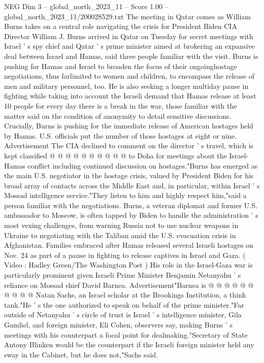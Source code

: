 \begin{textsample}{NEG Dim 3 – global\_north\_2023\_11 – Score 1.00 – global\_north\_2023\_11/200028529.txt}  \label{ex:f3_neg_278}
The meeting in Qatar comes as William Burns takes on a central role navigating the crisis for President Biden CIA Director William J.
Burns arrived in Qatar on Tuesday for secret meetings with Israel ' s spy chief and Qatar ' s prime minister aimed at brokering an expansive deal between Israel and Hamas, said three people familiar with the visit.
Burns is pushing for Hamas and Israel to broaden the focus of their ongoinghostage negotiations, thus farlimited to women and children, to encompass the release of men and military personnel, too.
He is also seeking a longer multiday pause in fighting while taking into account the Israeli demand that Hamas release at least 10 people for every day there is a break in the war, those familiar with the matter said on the condition of anonymity to detail sensitive discussions.
Crucially, Burns is pushing for the immediate release of American hostages held by Hamas.
U.S. officials put the number of those hostages at eight or nine.
Advertisement The CIA declined to comment on the director ' s travel, which is kept classified @ @ @ @ @ @ @ @ @ @ to Doha for meetings about the Israel-Hamas conflict including continued discussion on hostages."Burns has emerged as the main U.S. negotiator in the hostage crisis, valued by President Biden for his broad array of contacts across the Middle East and, in particular, within Israel ' s Mossad intelligence service."They listen to him and highly respect him,"said a person familiar with the negotiations.
Burns, a veteran diplomat and former U.S. ambassador to Moscow, is often tapped by Biden to handle the administration ' s most vexing challenges, from warning Russia not to use nuclear weapons in Ukraine to negotiating with the Taliban amid the U.S. evacuation crisis in Afghanistan.
Families embraced after Hamas released several Israeli hostages on Nov. 24 as part of a pause in fighting to release captives in Israel and Gaza. ( Video : Hadley Green/The Washington Post ) His role in the Israel-Gaza war is particularly prominent given Israeli Prime Minister Benjamin Netanyahu ' s reliance on Mossad chief David Barnea.
Advertisement"Barnea is @ @ @ @ @ @ @ @ @ @ Natan Sachs, an Israel scholar at the Brookings Institution, a think tank."He ' s the one authorized to speak on behalf of the prime minister."Far outside of Netanyahu ' s circle of trust is Israel ' s intelligence minister, Gila Gamliel, and foreign minister, Eli Cohen, observers say, making Burns ' s meetings with his counterpart a focal point for dealmaking."Secretary of State Antony Blinken would be the counterpart if the Israeli foreign minister held any sway in the Cabinet, but he does not,"Sachs said.

\end{textsample}
